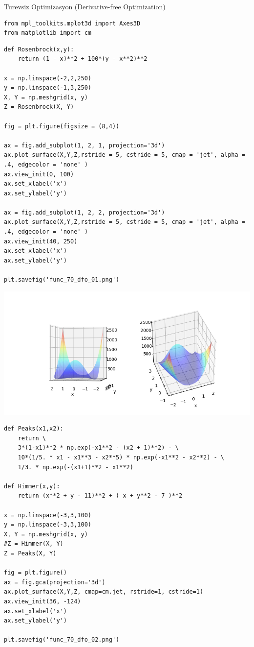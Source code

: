 \documentclass[12pt,fleqn]{article}\usepackage{../../common}
\begin{document}
Turevsiz Optimizasyon (Derivative-free Optimization)

\begin{verbatim}
from mpl_toolkits.mplot3d import Axes3D
from matplotlib import cm
\end{verbatim}


\begin{verbatim}
def Rosenbrock(x,y):
    return (1 - x)**2 + 100*(y - x**2)**2

x = np.linspace(-2,2,250)
y = np.linspace(-1,3,250)
X, Y = np.meshgrid(x, y)
Z = Rosenbrock(X, Y)

fig = plt.figure(figsize = (8,4))

ax = fig.add_subplot(1, 2, 1, projection='3d')
ax.plot_surface(X,Y,Z,rstride = 5, cstride = 5, cmap = 'jet', alpha = .4, edgecolor = 'none' )
ax.view_init(0, 100)
ax.set_xlabel('x')
ax.set_ylabel('y')

ax = fig.add_subplot(1, 2, 2, projection='3d')
ax.plot_surface(X,Y,Z,rstride = 5, cstride = 5, cmap = 'jet', alpha = .4, edgecolor = 'none' )
ax.view_init(40, 250)
ax.set_xlabel('x')
ax.set_ylabel('y')

plt.savefig('func_70_dfo_01.png')
\end{verbatim}

\includegraphics[width=35 em]{func_70_dfo_01.png}

\begin{verbatim}
def Peaks(x1,x2):
    return \
    3*(1-x1)**2 * np.exp(-x1**2 - (x2 + 1)**2) - \
    10*(1/5. * x1 - x1**3 - x2**5) * np.exp(-x1**2 - x2**2) - \
    1/3. * np.exp(-(x1+1)**2 - x1**2)

def Himmer(x,y):
    return (x**2 + y - 11)**2 + ( x + y**2 - 7 )**2

x = np.linspace(-3,3,100)
y = np.linspace(-3,3,100)
X, Y = np.meshgrid(x, y)
#Z = Himmer(X, Y)
Z = Peaks(X, Y)

fig = plt.figure()
ax = fig.gca(projection='3d')
ax.plot_surface(X,Y,Z, cmap=cm.jet, rstride=1, cstride=1)
ax.view_init(36, -124)
ax.set_xlabel('x')
ax.set_ylabel('y')

plt.savefig('func_70_dfo_02.png')
\end{verbatim}
\end{document}

